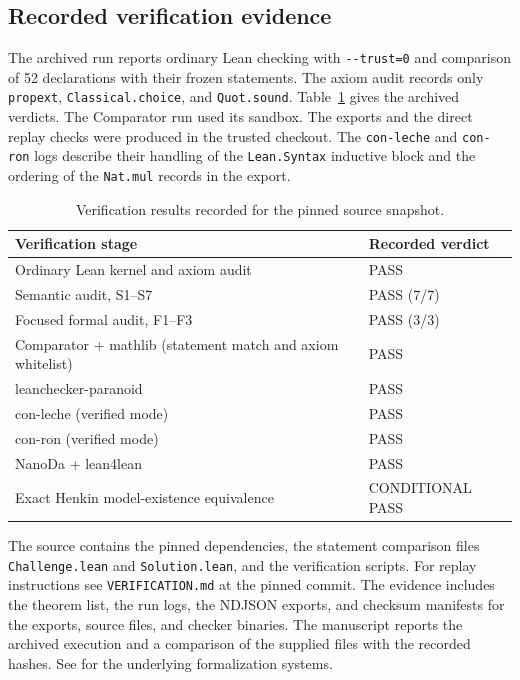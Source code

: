 \documentclass[11pt,a4paper]{article}
\numberwithin{equation}{section}
\theoremstyle{definition}
\theoremstyle{remark}
\newcommand{\code}[1]{\nolinkurl{#1}}
\begin{document}
\subsection{Recorded verification evidence}
The archived run reports ordinary Lean checking with \code{--trust=0} and comparison of 52 declarations with their frozen statements. The axiom audit records only \code{propext}, \code{Classical.choice}, and \code{Quot.sound}. Table~\ref{tab:checks} gives the archived verdicts. The Comparator run used its sandbox. The exports and the direct replay checks were produced in the trusted checkout. The \code{con-leche} and \code{con-ron} logs describe their handling of the \code{Lean.Syntax} inductive block and the ordering of the \code{Nat.mul} records in the export.

\begin{table}[!htbp]
\centering\small
\begin{tabularx}{\textwidth}{@{}Xl@{}}
\toprule
Verification stage & Recorded verdict\\
\midrule
Ordinary Lean kernel and axiom audit & PASS\\
Semantic audit, S1--S7 & PASS (7/7)\\
Focused formal audit, F1--F3 & PASS (3/3)\\
Comparator + mathlib (statement match and axiom whitelist) & PASS\\
leanchecker-paranoid & PASS\\
con-leche (verified mode) & PASS\\
con-ron (verified mode) & PASS\\
NanoDa + lean4lean & PASS\\
Exact Henkin model-existence equivalence & CONDITIONAL PASS\\
\bottomrule
\end{tabularx}
\caption{Verification results recorded for the pinned source snapshot.}\label{tab:checks}
\end{table}
\FloatBarrier

The source contains the pinned dependencies, the statement comparison files \code{Challenge.lean} and \code{Solution.lean}, and the verification scripts. For replay instructions see \code{VERIFICATION.md} at the pinned commit. The evidence includes the theorem list, the run logs, the NDJSON exports, and checksum manifests for the exports, source files, and checker binaries. The manuscript reports the archived execution and a comparison of the supplied files with the recorded hashes. See \cite{lean,mathlib} for the underlying formalization systems.
\end{document}
